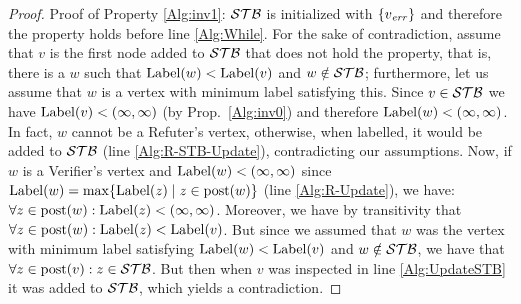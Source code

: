 \begin{proof}
	Proof of Property \ref{Alg:inv1}: $\mathcal{STB}$ is initialized with $\{v_{\mathit{err}} \}$ and therefore the property holds before line \ref{Alg:While}. 
For the sake of contradiction, assume that $v$ is the first node added to $\mathcal{STB}$ that does not hold the property, that is, there is a $w$ such that $\operatorname{Label}(w) < \operatorname{Label}(v)$ and
$w \notin \mathcal{STB}$; furthermore, let us assume that $w$ is a vertex with minimum label satisfying this. 
Since $v \in \mathcal{STB}$ we have $\operatorname{Label}(v)<(\infty, \infty)$ (by Prop.~\ref{Alg:inv0}) and therefore $\operatorname{Label}(w)< (\infty, \infty)$. 
In fact, $w$ cannot be a Refuter's vertex, otherwise, when labelled, it would be added to $\mathcal{STB}$ (line \ref{Alg:R-STB-Update}), 
contradicting our assumptions. 
Now, if $w$ is a Verifier's vertex and $\operatorname{Label}(w) < (\infty, \infty)$
since $\operatorname{Label}(w) = \max\{\operatorname{Label}(z) \mid z \in \operatorname{post}(w)\}$ (line \ref{Alg:R-Update}), we have: $\forall z \in \operatorname{post}(w) : \operatorname{Label}(z) < (\infty, \infty)$.
Moreover, we have by transitivity that $\forall z \in \operatorname{post}(w) : \operatorname{Label}(z) < \operatorname{Label}(v)$. But since we assumed that 
$w$ was the vertex with minimum label satisfying $\operatorname{Label}(w) < \operatorname{Label}(v)$ and $w \notin \mathcal{STB}$, we have 
that $\forall z \in \operatorname{post}(v) : z \in \mathcal{STB}$. But then when $v$ was inspected in line \ref{Alg:UpdateSTB} it was added to $\mathcal{STB}$, 
which yields a contradiction.


\end{proof}

